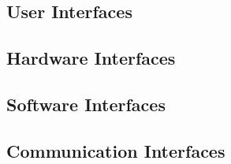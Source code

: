 \subsection{User Interfaces}
\label{subsect:User Interfaces}
\subsection{Hardware Interfaces}
\label{subsect:Hardware Interfaces}
\subsection{Software Interfaces}
\label{subsect:Software Interfaces}
\subsection{Communication Interfaces}
\label{subsect:Communication Interfaces}
